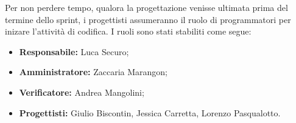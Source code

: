 \noindent Per non perdere tempo, qualora la progettazione venisse ultimata prima del termine dello sprint, i progettisti assumeranno il ruolo di programmatori per inizare l'attività di codifica. I ruoli sono stati stabiliti come segue:
\begin{itemize}
    \item \textbf{Responsabile:} Luca Securo;
    \item \textbf{Amministratore:} Zaccaria Marangon;
    \item \textbf{Verificatore:} Andrea Mangolini;
    \item \textbf{Progettisti:} Giulio Biscontin, Jessica Carretta, Lorenzo Pasqualotto.
\end{itemize}